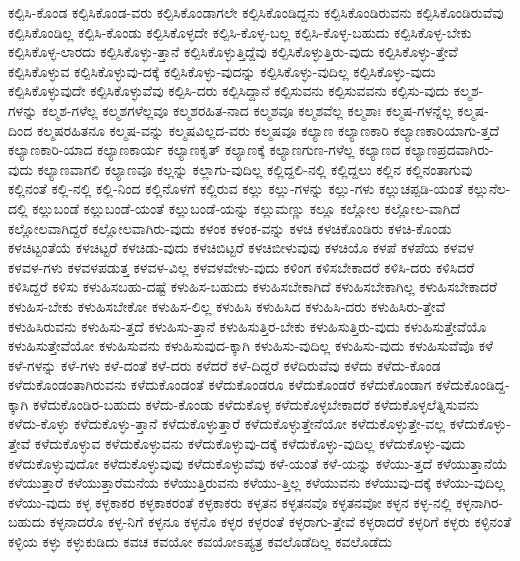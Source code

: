 {ಕಲ್ಪಿಸಿ-ಕೊಂಡ
ಕಲ್ಪಿಸಿಕೊಂಡ-ವರು
ಕಲ್ಪಿಸಿಕೊಂಡಾಗಲೇ
ಕಲ್ಪಿಸಿಕೊಂಡಿದ್ದನು
ಕಲ್ಪಿಸಿಕೊಂಡಿರುವನು
ಕಲ್ಪಿಸಿಕೊಂಡಿರುವೆವು
ಕಲ್ಪಿಸಿಕೊಂಡಿಲ್ಲ
ಕಲ್ಪಿಸಿ-ಕೊಂಡು
ಕಲ್ಪಿಸಿಕೊಳ್ಳದೇ
ಕಲ್ಪಿಸಿ-ಕೊಳ್ಳ-ಬಲ್ಲ
ಕಲ್ಪಿಸಿ-ಕೊಳ್ಳ-ಬಹುದು
ಕಲ್ಪಿಸಿಕೊಳ್ಳ-ಬೇಕು
ಕಲ್ಪಿಸಿಕೊಳ್ಳ-ಲಾರದು
ಕಲ್ಪಿಸಿಕೊಳ್ಳು-ತ್ತಾನೆ
ಕಲ್ಪಿಸಿಕೊಳ್ಳುತ್ತಿದ್ದೆವು
ಕಲ್ಪಿಸಿಕೊಳ್ಳುತ್ತಿರು-ವುದು
ಕಲ್ಪಿಸಿಕೊಳ್ಳು-ತ್ತೇವೆ
ಕಲ್ಪಿಸಿಕೊಳ್ಳುವ
ಕಲ್ಪಿಸಿಕೊಳ್ಳುವು-ದಕ್ಕೆ
ಕಲ್ಪಿಸಿಕೊಳ್ಳು-ವುದನ್ನು
ಕಲ್ಪಿಸಿಕೊಳ್ಳು-ವುದಿಲ್ಲ
ಕಲ್ಪಿಸಿಕೊಳ್ಳು-ವುದು
ಕಲ್ಪಿಸಿಕೊಳ್ಳುವುದೇ
ಕಲ್ಪಿಸಿಕೊಳ್ಳುವೆವು
ಕಲ್ಪಿಸಿ-ದರು
ಕಲ್ಪಿಸಿದ್ದಾನೆ
ಕಲ್ಪಿಸುವನು
ಕಲ್ಪಿಸುವವನು
ಕಲ್ಪಿಸು-ವುದು
ಕಲ್ಮಶ-ಗಳನ್ನು
ಕಲ್ಮಶ-ಗಳೆಲ್ಲ
ಕಲ್ಮಶಗಳೆಲ್ಲವೂ
ಕಲ್ಮಶರಹಿತ-ನಾದ
ಕಲ್ಮಶವೂ
ಕಲ್ಮಶವೆಲ್ಲ
ಕಲ್ಮಶಾಃ
ಕಲ್ಮಷ-ಗಳನ್ನೆಲ್ಲ
ಕಲ್ಮಷ-ದಿಂದ
ಕಲ್ಮಷರಹಿತನೂ
ಕಲ್ಮಷ-ವನ್ನು
ಕಲ್ಮಷವಿಲ್ಲದ-ವರು
ಕಲ್ಮಷವೂ
ಕಲ್ಯಾಣ
ಕಲ್ಯಾಣಕಾರಿ
ಕಲ್ಯಾಣಕಾರಿಯಾಗು-ತ್ತದೆ
ಕಲ್ಯಾಣಕಾರಿ-ಯಾದ
ಕಲ್ಯಾಣಕಾರ್ಯ
ಕಲ್ಯಾಣಕೃತ್
ಕಲ್ಯಾಣಕ್ಕೆ
ಕಲ್ಯಾಣಗುಣ-ಗಳೆಲ್ಲ
ಕಲ್ಯಾಣದ
ಕಲ್ಯಾಣಪ್ರದವಾಗಿರು-ವುದು
ಕಲ್ಯಾಣವಾಗಲಿ
ಕಲ್ಯಾಣವೂ
ಕಲ್ಲನ್ನು
ಕಲ್ಲಾಗು-ವುದಿಲ್ಲ
ಕಲ್ಲಿದ್ದಲಿ-ನಲ್ಲಿ
ಕಲ್ಲಿದ್ದಲು
ಕಲ್ಲಿನ
ಕಲ್ಲಿನಂತಾಗುವು
ಕಲ್ಲಿನಂತೆ
ಕಲ್ಲಿ-ನಲ್ಲಿ
ಕಲ್ಲಿ-ನಿಂದ
ಕಲ್ಲಿನೊಳಗೆ
ಕಲ್ಲಿರುವ
ಕಲ್ಲು
ಕಲ್ಲು-ಗಳನ್ನು
ಕಲ್ಲು-ಗಳು
ಕಲ್ಲುಚಪ್ಪಡಿ-ಯಂತೆ
ಕಲ್ಲುನೆಲ-ದಲ್ಲಿ
ಕಲ್ಲುಬಂಡೆ
ಕಲ್ಲುಬಂಡೆ-ಯಂತೆ
ಕಲ್ಲುಬಂಡೆ-ಯನ್ನು
ಕಲ್ಲುಮಣ್ಣು
ಕಲ್ಲೂ
ಕಲ್ಲೋಲ
ಕಲ್ಲೋಲ-ವಾಗಿದೆ
ಕಲ್ಲೋಲವಾಗಿದ್ದರೆ
ಕಲ್ಲೋಲವಾಗಿರು-ವುದು
ಕಳಂಕ
ಕಳಂಕ-ವನ್ನು
ಕಳಚಿ
ಕಳಚಿಕೊಂಡಿರು
ಕಳಚಿ-ಕೊಂಡು
ಕಳಚಿಟ್ಟಂತೆಯೆ
ಕಳಚಿಟ್ಟರೆ
ಕಳಚಿಡು-ವುದು
ಕಳಚಿಬಿಟ್ಟರೆ
ಕಳಚಿಬೀಳುವುವು
ಕಳಚಿಯೊ
ಕಳಪೆ
ಕಳಪೆಯ
ಕಳವಳ
ಕಳವಳ-ಗಳು
ಕಳವಳಪಡುತ್ತ
ಕಳವಳ-ವಿಲ್ಲ
ಕಳವಳವೇಳು-ವುದು
ಕಳಿಂಗ
ಕಳಿಸಬೇಕಾದರೆ
ಕಳಿಸಿ-ದರು
ಕಳಿಸಿದರೆ
ಕಳಿಸಿದ್ದರೆ
ಕಳಿಸು
ಕಳುಹಿಸಬಹು-ದಷ್ಟೆ
ಕಳುಹಿಸ-ಬಹುದು
ಕಳುಹಿಸಬೇಕಾಗಿದೆ
ಕಳುಹಿಸಬೇಕಾಗಿಲ್ಲ
ಕಳುಹಿಸಬೇಕಾದರೆ
ಕಳುಹಿಸ-ಬೇಕು
ಕಳುಹಿಸಬೇಕೋ
ಕಳುಹಿಸ-ಲಿಲ್ಲ
ಕಳುಹಿಸಿ
ಕಳುಹಿಸಿದ
ಕಳುಹಿಸಿ-ದರು
ಕಳುಹಿಸಿರು-ತ್ತೇವೆ
ಕಳುಹಿಸಿರುವನು
ಕಳುಹಿಸು-ತ್ತದೆ
ಕಳುಹಿಸು-ತ್ತಾನೆ
ಕಳುಹಿಸುತ್ತಿರ-ಬೇಕು
ಕಳುಹಿಸುತ್ತಿರು-ವುದು
ಕಳುಹಿಸುತ್ತೇವೆಯೊ
ಕಳುಹಿಸುತ್ತೇವೆಯೋ
ಕಳುಹಿಸುವನು
ಕಳುಹಿಸುವುದ-ಕ್ಕಾಗಿ
ಕಳುಹಿಸು-ವುದಿಲ್ಲ
ಕಳುಹಿಸು-ವುದು
ಕಳುಹಿಸುವೆವೊ
ಕಳೆ
ಕಳೆ-ಗಳನ್ನು
ಕಳೆ-ಗಳು
ಕಳೆ-ದಂತೆ
ಕಳೆ-ದರು
ಕಳೆದರೆ
ಕಳೆ-ದಿದ್ದರೆ
ಕಳೆದಿರುವೆವು
ಕಳೆದು
ಕಳೆದು-ಕೊಂಡ
ಕಳೆದುಕೊಂಡಂತಾಗಿರುವನು
ಕಳೆದುಕೊಂಡಂತೆ
ಕಳೆದುಕೊಂಡರೂ
ಕಳೆದುಕೊಂಡರೆ
ಕಳೆದುಕೊಂಡಾಗ
ಕಳೆದುಕೊಂಡಿದ್ದ-ಕ್ಕಾಗಿ
ಕಳೆದುಕೊಂಡಿರ-ಬಹುದು
ಕಳೆದು-ಕೊಂಡು
ಕಳೆದುಕೊಳ್ಳ
ಕಳೆದುಕೊಳ್ಳಬೇಕಾದರೆ
ಕಳೆದುಕೊಳ್ಳಲೆತ್ನಿಸುವನು
ಕಳೆದು-ಕೊಳ್ಳು
ಕಳೆದುಕೊಳ್ಳು-ತ್ತಾನೆ
ಕಳೆದುಕೊಳ್ಳುತ್ತಾರೆ
ಕಳೆದುಕೊಳ್ಳುತ್ತೇನೆಯೋ
ಕಳೆದುಕೊಳ್ಳುತ್ತೇ-ವಲ್ಲ
ಕಳೆದುಕೊಳ್ಳು-ತ್ತೇವೆ
ಕಳೆದುಕೊಳ್ಳುವ
ಕಳೆದುಕೊಳ್ಳುವನು
ಕಳೆದುಕೊಳ್ಳುವು-ದಕ್ಕೆ
ಕಳೆದುಕೊಳ್ಳು-ವುದಿಲ್ಲ
ಕಳೆದುಕೊಳ್ಳು-ವುದು
ಕಳೆದುಕೊಳ್ಳುವುದೋ
ಕಳೆದುಕೊಳ್ಳುವುವು
ಕಳೆದುಕೊಳ್ಳುವೆವು
ಕಳೆ-ಯಂತೆ
ಕಳೆ-ಯನ್ನು
ಕಳೆಯು-ತ್ತದೆ
ಕಳೆಯುತ್ತಾನೆಯೆ
ಕಳೆಯುತ್ತಾರೆ
ಕಳೆಯುತ್ತಾರೆಮನೆಯ
ಕಳೆಯುತ್ತಿರುವನು
ಕಳೆಯು-ತ್ತಿಲ್ಲ
ಕಳೆಯುವನು
ಕಳೆಯುವು-ದಕ್ಕೆ
ಕಳೆಯು-ವುದಿಲ್ಲ
ಕಳೆಯು-ವುದು
ಕಳ್ಳ
ಕಳ್ಳಕಾಕರ
ಕಳ್ಳಕಾಕರಂತೆ
ಕಳ್ಳಕಾಕರು
ಕಳ್ಳತನ
ಕಳ್ಳತನವೊ
ಕಳ್ಳತನವೋ
ಕಳ್ಳನ
ಕಳ್ಳ-ನಲ್ಲಿ
ಕಳ್ಳನಾಗಿರ-ಬಹುದು
ಕಳ್ಳನಾದರೊ
ಕಳ್ಳ-ನಿಗೆ
ಕಳ್ಳನೂ
ಕಳ್ಳನೊ
ಕಳ್ಳರ
ಕಳ್ಳರಂತೆ
ಕಳ್ಳರಾಗು-ತ್ತೇವೆ
ಕಳ್ಳರಾದರೆ
ಕಳ್ಳರಿಗೆ
ಕಳ್ಳರು
ಕಳ್ಳಿನಂತೆ
ಕಳ್ಳಿಯ
ಕಳ್ಳು
ಕಳ್ಳುಕುಡಿದು
ಕವಚ
ಕವಯೋ
ಕವಯೋಽಪ್ಯತ್ರ
ಕವಲೊಡೆದಿಲ್ಲ
ಕವಲೊಡೆದು
}
